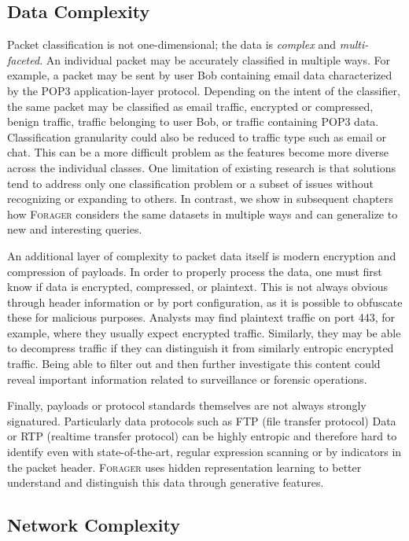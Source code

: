 \subsection{Data Complexity}

Packet classification is not one-dimensional; the data is \textit{complex} and \textit{multi-faceted}. An individual packet may be accurately classified in multiple ways. For example, a packet may be sent by user Bob containing email data characterized by the POP3 application-layer protocol. Depending on the intent of the classifier, the same packet may be classified as email traffic, encrypted or compressed, benign traffic, traffic belonging to user Bob, or traffic containing POP3 data. Classification granularity could also be reduced to traffic type such as email or chat. This can be a more difficult problem as the features become more diverse across the individual classes. One limitation of existing research is that solutions tend to address only one classification problem or a subset of issues without recognizing or expanding to others. In contrast, we show in subsequent chapters how \textsc{Forager} considers the same datasets in multiple ways and can generalize to new and interesting queries.

An additional layer of complexity to packet data itself is modern encryption and compression of payloads. In order to properly process the data, one must first know if data is encrypted, compressed, or plaintext. This is not always obvious through header information or by port configuration, as it is possible to obfuscate these for malicious purposes. Analysts may find plaintext traffic on port 443, for example, where they usually expect encrypted traffic. Similarly, they may be able to decompress traffic if they can distinguish it from similarly entropic encrypted traffic. Being able to filter out and then further investigate this content could reveal important information related to surveillance or forensic operations.

Finally, payloads or protocol standards themselves are not always strongly signatured. Particularly data protocols such as FTP (file transfer protocol) Data or RTP (realtime transfer protocol) can be highly entropic and therefore hard to identify even with state-of-the-art, regular expression scanning or by indicators in the packet header. \textsc{Forager} uses hidden representation learning to better understand and distinguish this data through generative features.

\subsection{Network Complexity}

